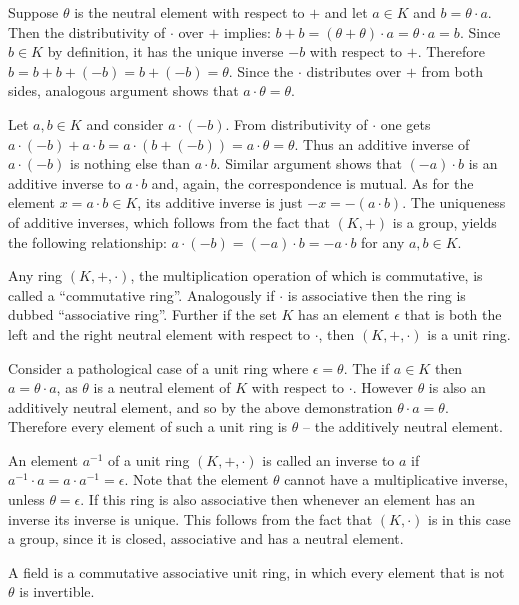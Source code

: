 \documentclass[a4paper]{article}
\newcommand{\brac}[1]{{\left({#1}\right)}}
\begin{document}
Suppose $\theta$ is the neutral element with respect to $+$ and let $a\in K$ and $b=\theta\cdot a$. Then the distributivity of $\cdot$ over $+$ implies: $b+b = \brac{\theta + \theta}\cdot a = \theta\cdot a = b$. Since $b\in K$ by definition, it has the unique inverse $-b$ with respect to $+$. Therefore $b = b+b + (-b) = b + (-b)=\theta$. Since the $\cdot$ distributes over $+$ from both sides, analogous argument shows that $a\cdot \theta = \theta$.

Let $a, b\in K$ and consider $a\cdot(-b)$. From distributivity of $\cdot$ one gets $a\cdot (-b) + a\cdot b = a\cdot\brac{b+(-b)} = a\cdot\theta = \theta$. Thus an additive inverse of $a\cdot (-b)$ is nothing else than $a\cdot b$. Similar argument shows that $(-a) \cdot b$ is an additive inverse to $a\cdot b$ and, again, the correspondence is mutual. As for the element $x=a\cdot b \in K$, its additive inverse is just $-x = -\brac{a\cdot b}$. The uniqueness of additive inverses, which follows from the fact that $\brac{K, +}$ is a group, yields the following relationship: $a\cdot(-b) = (-a)\cdot b = -a\cdot b$ for any $a, b\in K$.

Any ring $\brac{K, +, \cdot}$, the multiplication operation of which is commutative, is called a ``commutative ring''. Analogously if $\cdot$ is associative then the ring is dubbed ``associative ring''. Further if the set $K$ has an element $\epsilon$ that is both the left and the right neutral element with respect to $\cdot$, then $\brac{K, +, \cdot}$ is a unit ring.

Consider a pathological case of a unit ring where $\epsilon=\theta$. The if $a\in K$ then $a = \theta \cdot a$, as $\theta$ is a neutral element of $K$ with respect to $\cdot$. However $\theta$ is also an additively neutral element, and so by the above demonstration $\theta \cdot a = \theta$. Therefore every element of such a unit ring is $\theta$ -- the additively neutral element.

An element $a^{-1}$ of a unit ring $\brac{K, +, \cdot}$ is called an inverse to $a$ if $a^{-1}\cdot a = a\cdot a^{-1} = \epsilon$. Note that the element $\theta$ cannot have a multiplicative inverse, unless $\theta = \epsilon$. If this ring is also associative then whenever an element has an inverse its inverse is unique. This follows from the fact that $\brac{K, \cdot}$ is in this case a group, since it is closed, associative and has a neutral element.

A field is a commutative associative unit ring, in which every element that is not $\theta$ is invertible.
\end{document}
